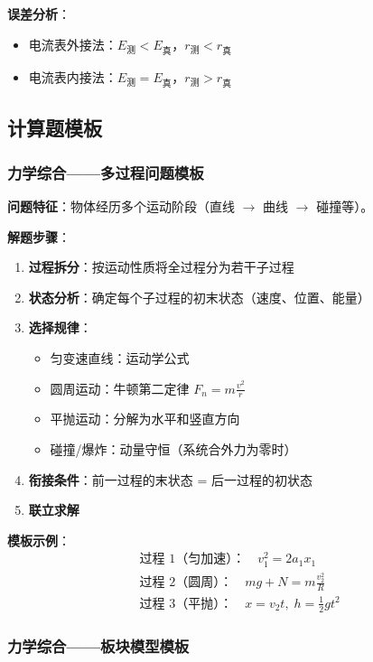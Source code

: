 \textbf{误差分析}：
\begin{itemize}
  \item 电流表外接法：$E_{\text{测}} < E_{\text{真}}$，$r_{\text{测}} < r_{\text{真}}$
  \item 电流表内接法：$E_{\text{测}} = E_{\text{真}}$，$r_{\text{测}} > r_{\text{真}}$
\end{itemize}

\subsection{计算题模板}

\subsubsection{力学综合——多过程问题模板}

\textbf{问题特征}：物体经历多个运动阶段（直线 $\to$ 曲线 $\to$ 碰撞等）。

\textbf{解题步骤}：
\begin{enumerate}
  \item \textbf{过程拆分}：按运动性质将全过程分为若干子过程
  \item \textbf{状态分析}：确定每个子过程的初末状态（速度、位置、能量）
  \item \textbf{选择规律}：
    \begin{itemize}
      \item 匀变速直线：运动学公式
      \item 圆周运动：牛顿第二定律 $F_n = m\frac{v^2}{r}$
      \item 平抛运动：分解为水平和竖直方向
      \item 碰撞/爆炸：动量守恒（系统合外力为零时）
    \end{itemize}
  \item \textbf{衔接条件}：前一过程的末状态 = 后一过程的初状态
  \item \textbf{联立求解}
\end{enumerate}

\textbf{模板示例}：
\[
\begin{aligned}
&\text{过程 1（匀加速）：} \quad v_1^2 = 2a_1x_1 \\
&\text{过程 2（圆周）：} \quad mg + N = m\frac{v_2^2}{R} \\
&\text{过程 3（平抛）：} \quad x = v_2t,\; h = \frac12 gt^2
\end{aligned}
\]

\subsubsection{力学综合——板块模型模板}

